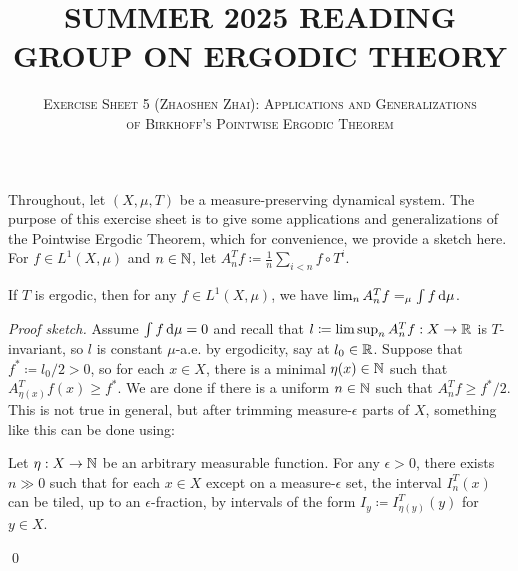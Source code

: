 \documentclass[reqno, twoside]{article}
\begin{document}
    \title{\textbf{\normalsize\MakeUppercase{Summer 2025 Reading Group on Ergodic Theory}}}
    \author{\normalsize\textsc{Exercise Sheet 5 (Zhaoshen Zhai): Applications and Generalizations}\\ \normalsize\textsc{of Birkhoff's Pointwise Ergodic Theorem}}
    \date{}
    \maketitle

    Throughout, let $(X,\mu,T)$ be a measure-preserving dynamical system. The purpose of this exercise sheet is to give some applications and generalizations of the Pointwise Ergodic Theorem, which for convenience, we provide a sketch here. For $f\in L^1(X,\mu)$ and $n\in\mathbb{N}$, let $A_n^Tf\coloneqq\frac{1}{n}\sum_{i<n}f\circ T^i$.

    \begin{theorem*}
        If $T$ is ergodic, then for any $f\in L^1(X,\mu)$, we have $\lim_nA_n^Tf=_\mu\int f\,\mathrm{d}\mu$.
    \end{theorem*}
    \begin{proof}[Proof sketch]
        Assume $\int f\,\mathrm{d}\mu=0$ and recall that $l\coloneqq\limsup_nA_n^Tf:X\to\mathbb{R}$ is $T$-invariant, so $l$ is constant $\mu$-a.e. by ergodicity, say at $l_0\in\mathbb{R}$. Suppose that $f^\ast\coloneqq l_0/2>0$, so for each $x\in X$, there is a minimal $\eta(x)\in\mathbb{N}$ such that $A^T_{\eta(x)}f(x)\geq f^\ast$. We are done if there is a uniform $n\in\mathbb{N}$ such that $A_n^Tf\geq f^\ast/2$. This is not true in general, but after trimming measure-$\epsilon$ parts of $X$, something like this can be done using:
        \begin{center}
            \begin{minipage}{0.95\textwidth}
                \begin{lemma*}
                    Let $\eta:X\to\mathbb{N}$ be an arbitrary measurable function. For any $\epsilon>0$, there exists $n\gg0$ such that for each $x\in X$ except on a measure-$\epsilon$ set, the interval $I_n^T(x)$ can be tiled, up to an $\epsilon$-fraction, by intervals of the form $I_y\coloneqq I_{\eta(y)}^T(y)$ for $y\in X$.
                \end{lemma*}
            \end{minipage}
        \end{center}\vspace{-0.25in}\qed
    \end{proof}
\end{document}
